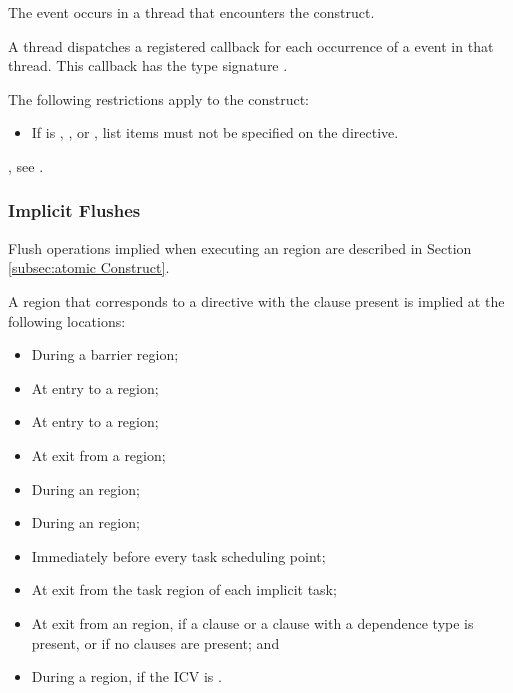 \events

The  event occurs in a thread that encounters the  construct.

\tools

A thread dispatches a registered  callback
for each occurrence of a  event in that thread. This
callback has the type signature .

\restrictions
The following restrictions apply to the  construct:

\begin{itemize}
\item If  is , , or
      , list items must not be specified on the  directive.
\end{itemize}

\begin{crossrefs}
\item {}, see
.
\end{crossrefs}

\subsubsection{Implicit Flushes}
\label{subsec:implicit flushes}

Flush operations implied when executing an  region are described in
Section \ref{subsec:atomic Construct}.

A  region that corresponds to a  directive with the
 clause present is implied at the following locations:

\begin{itemize}
\item During a barrier region;
\item At entry to a  region;
\item At entry to a  region;
\item At exit from a  region;
\item During an  region;
\item During an  region;
\item Immediately before every task scheduling point;
\item At exit from the task region of each implicit task;
\item At exit from an  region, if a  clause or 
      a  clause with a  dependence type is present, 
      or if no clauses are present; and
\item During a  region, if the  ICV is .
\end{itemize}

